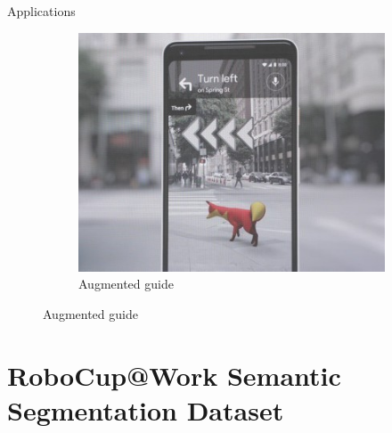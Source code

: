\documentclass{beamer}
\begin{document}
\begin{frame}{Applications}
\begin{figure}
\begin{subfigure}{0.3\textwidth}
		\end{subfigure}
		\begin{subfigure}{0.3\textwidth}
			\centering
			\includegraphics[width=0.8\linewidth]{images/vr_dog}
			\captionsetup{justification=centering,margin=0.2cm}
			\caption{Augmented guide \cite{techcrunch}}
		\end{subfigure}
		\label{Fig:app}
	\end{figure}

\end{frame}

\section{RoboCup@Work Semantic Segmentation Dataset}
\end{document}
